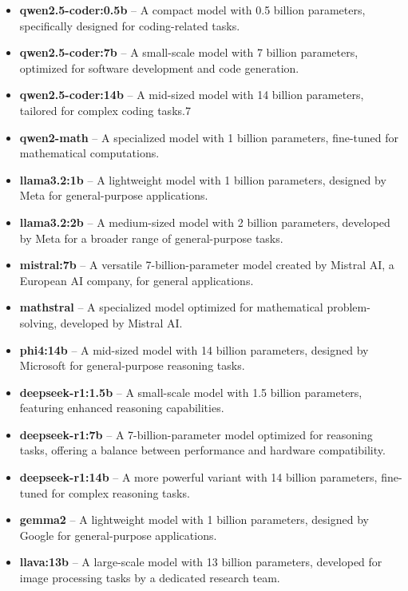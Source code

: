 \begin{itemize}
    \item \textbf{qwen2.5-coder:0.5b} – A compact model with 0.5 billion parameters, specifically designed for coding-related tasks.
    \item \textbf{qwen2.5-coder:7b} – A small-scale model with 7 billion parameters, optimized for software development and code generation.
    \item \textbf{qwen2.5-coder:14b} – A mid-sized model with 14 billion parameters, tailored for complex coding tasks.7
    \item \textbf{qwen2-math} – A specialized model with 1 billion parameters, fine-tuned for mathematical computations.
    \item \textbf{llama3.2:1b} – A lightweight model with 1 billion parameters, designed by Meta for general-purpose applications.
    \item \textbf{llama3.2:2b} – A medium-sized model with 2 billion parameters, developed by Meta for a broader range of general-purpose tasks.
    \item \textbf{mistral:7b} – A versatile 7-billion-parameter model created by Mistral AI, a European AI company, for general applications.
    \item \textbf{mathstral} – A specialized model optimized for mathematical problem-solving, developed by Mistral AI.
    \item \textbf{phi4:14b} – A mid-sized model with 14 billion parameters, designed by Microsoft for general-purpose reasoning tasks.
    \item \textbf{deepseek-r1:1.5b} – A small-scale model with 1.5 billion parameters, featuring enhanced reasoning capabilities.
    \item \textbf{deepseek-r1:7b} – A 7-billion-parameter model optimized for reasoning tasks, offering a balance between performance and hardware compatibility.
    \item \textbf{deepseek-r1:14b} – A more powerful variant with 14 billion parameters, fine-tuned for complex reasoning tasks.
    \item \textbf{gemma2} – A lightweight model with 1 billion parameters, designed by Google for general-purpose applications.
    \item \textbf{llava:13b} – A large-scale model with 13 billion parameters, developed for image processing tasks by a dedicated research team. \cite{llava-introduction}
\end{itemize}

